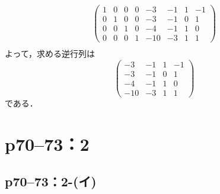 \begin{tanswer}
\begin{align*}
    \left( \begin{array}{cccc|cccc}
               1 & 0 & 0 & 0 & -3  & -1 & 1 & -1 \\
               0 & 1 & 0 & 0 & -3  & -1 & 0 & 1  \\
               0 & 0 & 1 & 0 & -4  & -1 & 1 & 0  \\
               0 & 0 & 0 & 1 & -10 & -3 & 1 & 1
             \end{array}
    \right)                                         \\
  \end{align*}
  よって，求める逆行列は
  \[
    \begin{pmatrix} -3 & -1 & 1& -1 \\ -3 & -1 & 0 & 1 \\ -4 & -1 & 1 & 0 \\ -10 & -3 & 1& 1 \end{pmatrix}
  \]
  である．
\end{tanswer}



\section*{p70--73：2}

\subsection*{p70--73：2-(イ)}

